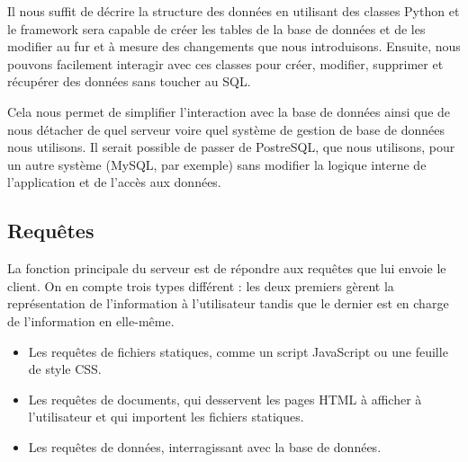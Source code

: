 \documentclass{EPL-master-thesis-covers-FR}
\begin{document}
				Il nous suffit de décrire la structure des données en utilisant des classes Python et le framework sera capable de créer les tables de la base de données et de les modifier au fur et à mesure des changements que nous introduisons. Ensuite, nous pouvons facilement interagir avec ces classes pour créer, modifier, supprimer et récupérer des données sans toucher au SQL.

				Cela nous permet de simplifier l'interaction avec la base de données ainsi que de nous détacher de quel serveur voire quel système de gestion de base de données nous utilisons. Il serait possible de passer de PostreSQL, que nous utilisons, pour un autre système (MySQL, par exemple) sans modifier la logique interne de l'application et de l'accès aux données.

			\subsection{Requêtes}

				La fonction principale du serveur est de répondre aux requêtes que lui envoie le client. On en compte trois types différent : les deux premiers gèrent la représentation de l'information à l'utilisateur tandis que le dernier est en charge de l'information en elle-même.

				\begin{itemize}
					\item Les requêtes de fichiers statiques, comme un script JavaScript ou une feuille de style CSS.
					\item Les requêtes de documents, qui desservent les pages HTML à afficher à l'utilisateur et qui importent les fichiers statiques.
					\item Les requêtes de données, interragissant avec la base de données.
				\end{itemize}


\end{document}
